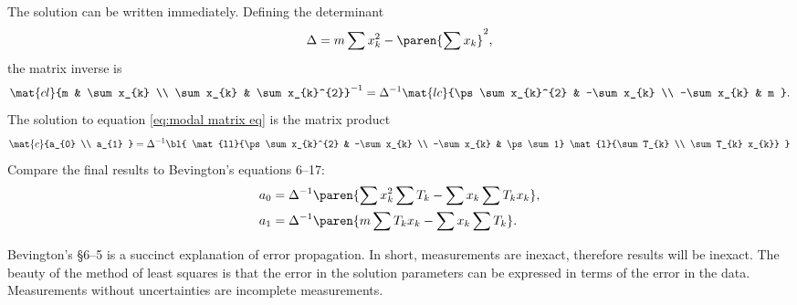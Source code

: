 The solution can be written immediately. Defining the determinant
  \begin{equation*}   %
    \Delta = m \sum x_{k}^{2} - \paren{\sum x_{k}}^{2},
  \end{equation*}
the matrix inverse is
  \begin{equation}   %
    \mat{cl}{m & \sum x_{k} \\ \sum x_{k} & \sum x_{k}^{2}}^{-1} = \Delta^{-1} 
    \mat{lc}{\ps \sum x_{k}^{2} & -\sum x_{k} \\ -\sum x_{k} & m } .
    \label{eq:bevington matrix inverse}
  \end{equation}
The solution to equation \eqref{eq:modal matrix eq} is the matrix product
  \begin{equation*}
    \mat{c}{a_{0} \\ a_{1} } = \Delta^{-1}
    \bl{
    \mat{ll}{\ps \sum x_{k}^{2} & -\sum x_{k} \\ -\sum x_{k} & \ps \sum 1}
    \mat{l}{\sum T_{k} \\ \sum T_{k} x_{k}}
    }
    \label{eqn:bevington solution product}
  \end{equation*}
Compare the final results to Bevington's equations 6--17:
  \begin{equation*}
  \begin{split}
    a_{0} &= \Delta^{-1} \paren{\sum x_{k}^{2}\sum T_{k} - \sum x_{k}\sum T_{k} x_{k}}, \\
    a_{1} &= \Delta^{-1} \paren{m \sum T_{k} x_{k} - \sum x_{k}\sum T_{k}}.
  \label{eqn:bevington soln}
  \end{split}
  \end{equation*}

Bevington's \S 6--5 is a succinct explanation of error propagation. In short, measurements are inexact, therefore results will be inexact. The beauty of the method of least squares is that the error in the solution parameters can be expressed in terms of the error in the data. Measurements without uncertainties are incomplete measurements.

